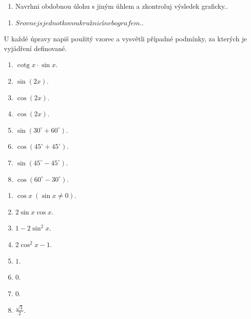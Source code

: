 \documentclass[11pt,a4paper]{article}
\begin{document}
\begin{zadaniReseniBox}[title={Rozšíření 1}]
\begin{enumerate}[label=\alph*)]
\item Navrhni obdobnou úlohu s jiným úhlem a zkontroluj výsledek graficky..
\end{enumerate}
\tcblower
\begin{enumerate}[label=\alph*)]
\item $Srovnej s jednotkovou kružnicí nebo grafem.$.
\end{enumerate}
\end{zadaniReseniBox}
U každé úpravy napiš použitý vzorec a vysvětli případné podmínky, za kterých je vyjádření definované.
\begin{zadaniReseniBox}[title={Domácí úkol}]
\begin{enumerate}[label=\alph*)]
\item $\operatorname{cotg}x\cdot\sin x$.
\item $\sin(2x)$.
\item $\cos(2x)$.
\item $\cos(2x)$.
\item $\sin(30^\circ+60^\circ)$.
\item $\cos(45^\circ+45^\circ)$.
\item $\sin(45^\circ-45^\circ)$.
\item $\cos(60^\circ-30^\circ)$.
\end{enumerate}
\tcblower
\begin{enumerate}[label=\alph*)]
\item $\cos x\;(\sin x\ne0)$.
\item $2\sin x\cos x$.
\item $1-2\sin^2x$.
\item $2\cos^2x-1$.
\item $1$.
\item $0$.
\item $0$.
\item $\frac{\sqrt3}{2}$.
\end{enumerate}
\end{zadaniReseniBox}
\end{document}
